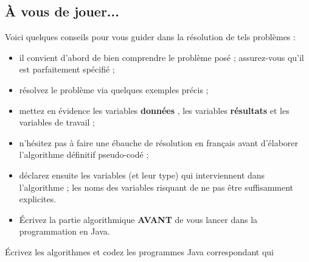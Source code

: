 \documentclass[11pt,a4paper]{article}
\begin{document}
            \par
        \subsection{\`A vous de jouer...}
          Voici quelques conseils pour vous guider dans la r\'esolution de tels probl\`emes :
          
					\begin{itemize}
				
			\item il convient d'abord de bien comprendre le probl\`eme pos\'e ; assurez-vous qu'il est parfaitement sp\'ecifi\'e ;
			\item r\'esolvez le probl\`eme via quelques exemples pr\'ecis ;
			\item mettez en \'evidence les variables \textbf{\guillemotleft  donn\'ees \guillemotright }, les variables \textbf{\guillemotleft  r\'esultats \guillemotright } et les variables de travail ;
			\item n'h\'esitez pas \`a faire une \'ebauche de r\'esolution en fran\c cais avant d'\'elaborer l'algorithme d\'efinitif pseudo-cod\'e ;
			\item d\'eclarez ensuite les variables (et leur type) qui interviennent dans l'algorithme ; les noms des variables risquant de ne pas \^etre suffisamment explicites.
			\item \'Ecrivez la partie algorithmique \textbf{AVANT} de vous lancer dans la programmation en Java.
					\end{itemize}
				
            \par
        
        \'Ecrivez les algorithmes et codez les programmes Java correspondant qui 
          
\end{document}
